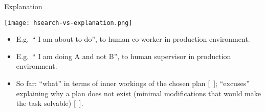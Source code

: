 \begin{frame}{Explanation}

{\small

\medskip

{\centering

\texttt{[image: hsearch-vs-explanation.png]} 

\smallskip


}

\smallskip \pause

{\footnotesize

\begin{itemize}
\item E.g.\ `` I am about to do'', to human co-worker 
in production environment.
\item E.g.\ `` I am doing A and not B'', to human 
supervisor in production environment.\pause
\item So far: ``what'' in terms of inner workings of the chosen plan 
{\scriptsize
[\eg\ \cite{mcguiness:etal:flairs-07,khan:etal:icaps-09,seegebarth:etal:icaps-12}]};
``excuses'' explaining why a plan does not exist (minimal
modifications that would make the task solvable) {\scriptsize
[\eg\ \cite{goebelbecker:etal:icaps-10}]}.
\end{itemize}

\pause

%

}

}

\medskip

\end{frame}


